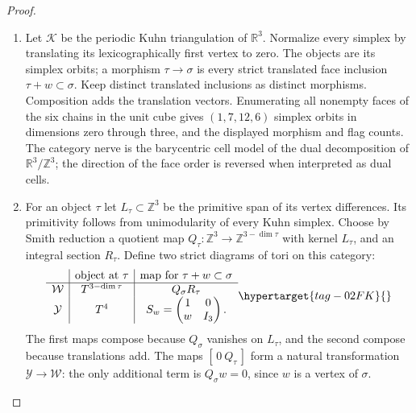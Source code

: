 \documentclass[11pt,a4paper]{article}
\numberwithin{equation}{section}
\theoremstyle{definition}
\begin{document}
\begin{proof}
\begin{enumerate}[label=\arabic*.]
\item Let $\mathcal K$ be the periodic Kuhn triangulation of
$\mathbb R^3$.  Normalize every simplex by translating its
lexicographically first vertex to zero.  The objects are its
simplex orbits; a morphism $\tau\to\sigma$ is every strict
translated face inclusion $\tau+w\subset\sigma$.
Keep distinct translated inclusions as distinct morphisms.
Composition adds the translation vectors.  Enumerating all
nonempty faces of the six chains in the unit cube gives
$(1,7,12,6)$ simplex orbits in dimensions zero through three,
and the displayed morphism and flag counts.  The category
nerve is the barycentric cell model of the dual decomposition
of $\mathbb R^3/\mathbb Z^3$; the direction of the face order
is reversed when interpreted as dual cells.

\item For an object $\tau$ let $L_\tau\subset\mathbb Z^3$ be the
primitive span of its vertex differences.  Its primitivity
follows from unimodularity of every Kuhn simplex.  Choose by
Smith reduction a quotient map
$Q_\tau:\mathbb Z^3\to\mathbb Z^{3-\dim\tau}$ with kernel
$L_\tau$, and an integral section $R_\tau$.
Define two strict diagrams of tori on this category:
\begin{equation}
\begin{array}{c|c|c}
 &\text{object at }\tau&\text{map for }\tau+w\subset\sigma\\\hline
\mathcal W&T^{3-\dim\tau}&Q_\sigma R_\tau\\
\mathcal Y&T^4&S_w=\begin{pmatrix}1&0\\ w&I_3\end{pmatrix}.
\end{array}                                                \hypertarget{tag-02FK}{}\label{maps:eq:F.CK2}
\end{equation}
The first maps compose because $Q_\sigma$ vanishes on
$L_\tau$, and the second compose because translations add.
The maps $[\,0\ Q_\tau\,]$ form a natural transformation
$\mathcal Y\to\mathcal W$: the only additional term is
$Q_\sigma w=0$, since $w$ is a vertex of $\sigma$.


\end{enumerate}
\end{proof}
\end{document}
